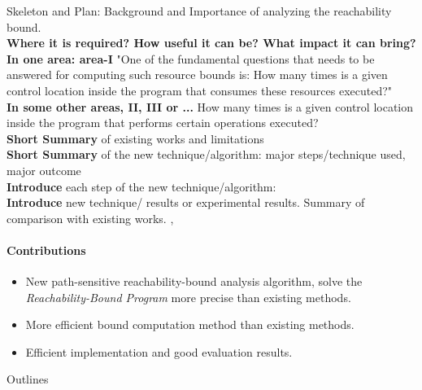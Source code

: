 Skeleton and Plan: Background and Importance of analyzing the reachability bound.
\\
\textbf{Where it is required? How useful it can be? What impact it can bring?}
\\
\textbf{In one area: area-I}
"One of the fundamental questions that needs to be answered for computing such resource bounds is: 
How many times is a given control location inside the program that consumes these resources executed?"
\\
\textbf{In some other areas, II, III or ...}
How many times is a given control location inside the program that performs certain operations executed?
\\
\textbf{Short Summary} of existing works and limitations
\\
\textbf{Short Summary} of the new technique/algorithm: major steps/technique used,  major outcome
\\
\textbf{Introduce} each step of the new technique/algorithm:
\\
\textbf{Introduce} new technique/ results or experimental results. 
Summary of comparison with existing works. \cite{GulwaniJK09} \cite{Sumit2010rechability}, \cite{sinn2017complexity}
\\
\paragraph{Contributions}
\begin{itemize}
  \item New path-sensitive reachability-bound analysis algorithm, 
  solve the \emph{Reachability-Bound Program} more precise than existing methods.
  \item More efficient bound computation method than existing methods.
  \item Efficient implementation and good evaluation results.
\end{itemize}
Outlines